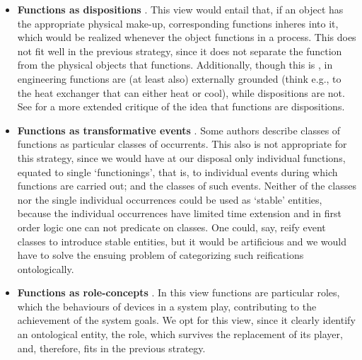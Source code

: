 \documentclass[
]{ceurart}
\begin{document}
\begin{itemize}
  \item \textbf{Functions as dispositions} \cite{arpFunctionRoleDisposition2008, barryBasicFormalOntology2015}. This view would entail that, if an object has the appropriate physical make-up, corresponding functions inheres into it, which would be realized whenever the object functions in a process. This does not fit well in the previous strategy, since it does not separate the function from the physical objects that functions. Additionally, though this is , in engineering functions are (at least also) externally grounded (think e.g., to the heat exchanger that can either heat or cool), while dispositions are not. See \cite{rohlWhyFunctionsAre2014} for a more extended critique of the idea that functions are dispositions. %
  \item \textbf{Functions as transformative events} \cite{borgoFormalizationFunctionsOperations2011, garbagarbaczTwoOntologydrivenFormalisations2011, garbaczStandardTaxonomyArtifact2005}. Some authors describe classes of functions as particular classes of occurrents. %
   This also is not appropriate  %
   for this strategy, since we would have at our disposal only individual functions, equated to single `functionings', that is, to individual events during which functions are carried out; and the classes of such events. Neither of the classes nor the single individual occurrences could be used as `stable' entities, because the individual occurrences have limited time extension and in first order logic one can not predicate on classes.
   One could, say, reify event classes  to introduce stable entities, but it would be artificious and we would have to solve the ensuing problem of categorizing such reifications ontologically. %
  \item \textbf{Functions as role-concepts} \cite{sasajimaFBRLFunctionBehavior1995}. In this view functions are particular roles, which the behaviours of devices in a system play, contributing to the achievement of the system goals. We opt for this view, since it clearly identify an ontological entity, the role, which survives the replacement of its player, and, therefore, fits in the previous strategy. 
\end{itemize}
\end{document}

